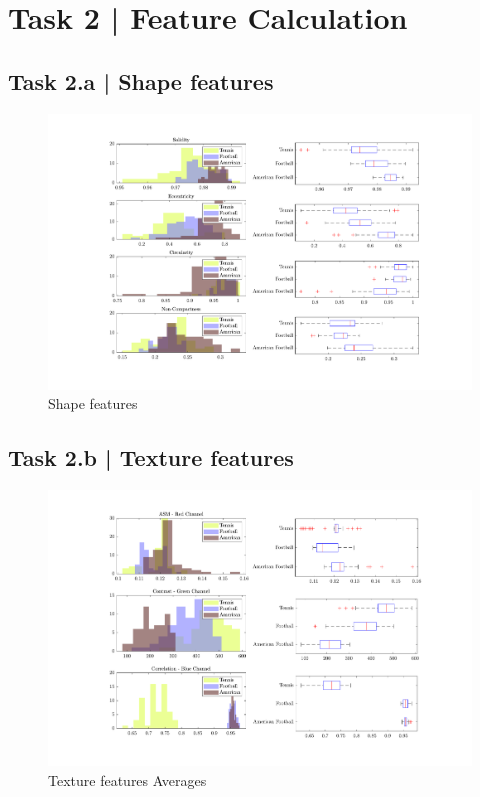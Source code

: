 \documentclass[conference]{IEEEtran}
\begin{document}
\section*{Task 2 | Feature Calculation}

\subsection*{Task 2.a | Shape features}

\begin{figure}[htbp]
    \centering
    \includegraphics[width=\columnwidth]{figures/shape_feats.pdf}
    \caption{Shape features\label{fig:shape_feats}}
\end{figure}


\subsection*{Task 2.b | Texture features}

\begin{figure}[htbp]
    \centering
    \includegraphics[width=\columnwidth]{figures/averages.pdf}
    \caption{Texture features Averages\label{fig:tex_feats_avgs}}
\end{figure}
\end{document}
